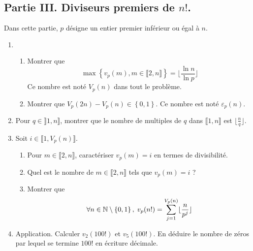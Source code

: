 \subsection*{Partie III. Diviseurs premiers de $n!$.}
Dans cette partie, $p$ désigne un entier premier inférieur ou égal à $n$.
\begin{enumerate}
  \item 
\begin{enumerate}
\item Montrer que 
\begin{displaymath}
  \max\left\lbrace v_p(m), m\in \llbracket 2, n \rrbracket\right\rbrace = \lfloor \frac{\ln n}{ \ln p} \rfloor
\end{displaymath}
Ce nombre est noté $V_p(n)$ dans tout le problème.
\item Montrer que $V_p(2n) - V_p(n) \in \left\lbrace  0,1 \right\rbrace$. Ce nombre est noté $\varepsilon_p(n)$.
\end{enumerate}
  
  \item Pour $q \in \rrbracket 1,n\rrbracket$, 
  montrer que le nombre de multiples de $q$ dans $\llbracket 1,n \rrbracket$ est $\lfloor \frac{n}{q}\rfloor$.

  \item Soit $i\in \llbracket 1, V_p(n)\rrbracket$.
  \begin{enumerate}
\item Pour $m\in \llbracket 2,n\rrbracket$, caractériser $v_p(m)=i$ en termes de divisibilité.
\item Quel est le nombre de $m\in \llbracket 2,n\rrbracket$ tels que $v_p(m)=i$ ?
  \item Montrer que 
\begin{displaymath}
\forall n \in \mathbb{N}\setminus\left\lbrace 0,1\right\rbrace, \;   v_p(n!) = \sum_{j=1}^{V_p(n)}\lfloor \frac{n}{p^j} \rfloor
\end{displaymath}
\end{enumerate}
\item Application. Calculer $v_2(100!)$ et $v_5(100!)$. En déduire le nombre de zéros par lequel se termine $100!$ en écriture décimale.

\end{enumerate}


